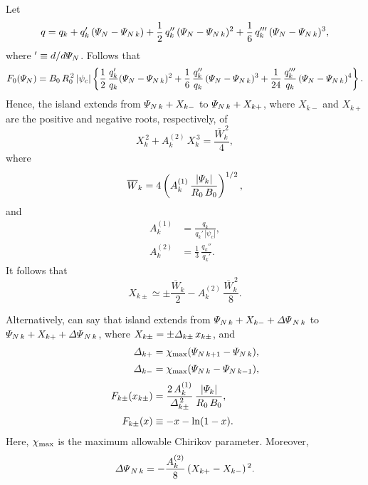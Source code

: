 \documentclass[notitlepage,12pt]{article}
\begin{document}
Let
\begin{equation}
q = q_k + q_k'\,({\mit\Psi}_N-{\mit\Psi}_{N\,k})+ \frac{1}{2}\,q_k''\,({\mit\Psi}_N-{\mit\Psi}_{N\,k})^2+ \frac{1}{6}\,q_k'''\,({\mit\Psi}_N-{\mit\Psi}_{N\,k})^3,
\end{equation}
where $'\equiv d/d{\mit\Psi}_N$. Follows that
\begin{equation}
F_0({\mit\Psi}_N) = B_0\,R_0^{\,2}\,|\psi_c|\left\{\frac{1}{2}\,\frac{q_k'}{q_k}({\mit\Psi}_N-{\mit\Psi}_{N\,k})^2+  \frac{1}{6}\,\frac{q_k''}{q_k}\,({\mit\Psi}_N-{\mit\Psi}_{N\,k})^3+ \frac{1}{24}\,
\frac{q_k'''}{q_k}\,({\mit\Psi}_N-{\mit\Psi}_{N\,k})^4\right\}.
\end{equation}
Hence, the island extends from  ${\mit\Psi}_{N\,k}+X_{k-}$ to ${\mit\Psi}_{N\,k}+X_{k+}$, where $X_{k-}$ and $X_{k+}$ are the
positive and negative roots, respectively, of 
\begin{equation}
X_k^{\,2}+  A_k^{(2)}\,X_k^{\,3}= \frac{\overline{W}_k^{\,2}}{4},
\end{equation}
where
\begin{equation}
\overline{W}_k=4\left(A_k^{(1)}\,\frac{|{\mit\Psi}_k|}{R_0\,B_0}\right)^{1/2},
\end{equation}
and
\begin{align}
A_k^{(1)} &= \frac{q_k}{q_k'\,|\psi_c|},\\[0.5ex]
A_k^{(2)}& =  \frac{1}{3}\,\frac{q_k''}{q_k'}.
\end{align}
It follows that
\begin{equation}
X_{k\pm} \simeq \pm \frac{\overline{W}_k}{2} - A_k^{(2)}\,\frac{\overline{W}_k^{\,2}}{8}.
\end{equation}

Alternatively, can say that island extends from  ${\mit\Psi}_{N\,k}+X_{k-} + {\mit\Delta\Psi}_{N\,k}$ to ${\mit\Psi}_{N\,k}+X_{k+}+{\mit\Delta\Psi}_{N\,k}$,
where $X_{k\pm} = \pm{\mit\Delta}_{k\pm}\,x_{k\pm}$,
and
\begin{align}
{\mit\Delta}_{k+} &= \chi_{\rm max}({\mit\Psi}_{N\,k+1}-{\mit\Psi}_{N\,k}),\\[0.5ex]
{\mit\Delta}_{k-} &=\chi_{\rm max}( {\mit\Psi}_{N\,k}-{\mit\Psi}_{N\,k-1}),\\[0.5ex]
F_{k\pm}(x_{k\pm}) &= \frac{2\,A_k^{(1)}}{{\mit\Delta}_{k\pm}^{\,2}}\,\frac{|{\mit\Psi}_k|}{R_0\,B_0},\\[0.5ex]
F_{k\pm}(x)&\equiv - x -\ln(1-x).
\end{align}
Here,  $\chi_{\rm max}$ is the maximum allowable Chirikov parameter.
Moreover,
\begin{equation}
{\mit\Delta\Psi}_{N\,k } = -\frac{A_k^{(2)}}{8}\,(X_{k+}-X_{k-})^{\,2}.
\end{equation}
\end{document}
